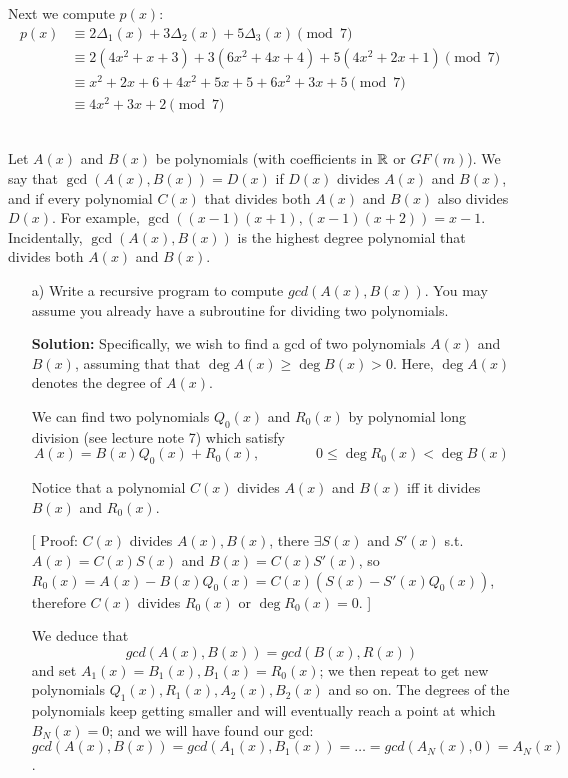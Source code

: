 \documentclass[]{article}
\newif\ifsolutions
\renewcommand{\answer}[1]{{\color{mydarkblue}\textbf{Solution:}#1}}
\begin{document}
\begin{qunlist}
\begin{itemize}
{{Next we compute $p(x)$:
\begin{align*}
p(x) &\equiv 2 \Delta_1(x) + 3 \Delta_2(x) + 5 \Delta_3(x)  \pmod 7\\
&\equiv 2(4x^2+x+3)+3(6x^2+4x+4)+5(4x^2+2x+1)\pmod 7\\
&\equiv x^2+2x+6+4x^2+5x+5+6x^2+3x+5 \pmod 7\\
&\equiv 4x^2+3x+2 \pmod 7
\end{align*}


}}\fi

\end{itemize}



\newpage


 \\   %
Let $A(x)$ and $B(x)$ be polynomials (with coefficients in $\mathbb{R}$ or $GF(m)$). We say that  $\gcd(A(x), B(x)) = D(x)$ if $D(x)$ divides $A(x)$ and $B(x)$, and if every polynomial $C(x)$ that divides both $A(x)$ and $B(x)$ also divides $D(x)$. For example, $\gcd((x-1)(x+1), (x-1)(x+2)) = x-1$. Incidentally, $\gcd(A(x), B(x))$ is the highest degree polynomial that divides both $A(x)$ and $B(x)$.

\begin{itemize}
\qpart
\item[a)] Write a recursive program to compute $gcd(A(x),B(x))$. 
You may assume you already have a subroutine for dividing two polynomials. 


\answer{
Specifically, we wish to find a gcd of two polynomials $A(x)$ and $B(x)$, assuming that that $\deg{A(x)} \geq \deg{B(x)} > 0$. Here, $\deg{A(x)}$ denotes the degree of $A(x)$.

We can find two polynomials $Q_0(x)$ and $R_0(x)$ by polynomial long division (see lecture note 7) which satisfy
\[ A(x) = B(x)Q_0(x) + R_0(x), \qquad\qquad  0 \leq \deg{R_0(x)} < \deg{B(x)} \]

Notice that a polynomial $C(x)$ divides $A(x)$ and $B(x)$ iff it divides $B(x)$ and $R_0(x)$.

[
Proof: $C(x)$ divides $A(x),B(x)$, there $\exists S(x)$ and $S'(x)$ s.t. $A(x)=C(x)S(x)$ and $B(x)=C(x)S'(x)$, so $R_0(x) = A(x)-B(x)Q_0(x) = C(x)(S(x)-S'(x)Q_0(x))$, therefore $C(x)$ divides $R_0(x)$ or $\deg{R_0(x)}=0$.  
]

 
We deduce that 
\[ gcd(A(x), B(x)) = gcd(B(x), R(x)) \]
and set $A_1(x)=B_1(x), B_1(x)=R_0(x)$; we then repeat to get new polynomials $Q_1(x),R_1(x),A_2(x),B_2(x)$ and so on. The degrees of the polynomials keep getting smaller and will eventually reach a point at which $B_N(x)=0$; and we will have found our gcd: 
\[ gcd(A(x),B(x))=gcd(A_1(x),B_1(x))=\dots=gcd(A_N(x),0)=A_N(x) \]. 

}
\end{itemize}
\end{qunlist}
\end{document}
